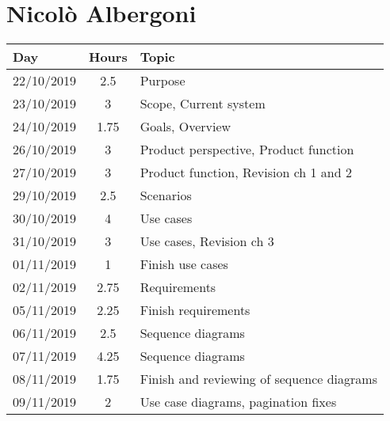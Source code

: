\section{Nicolò Albergoni}
\begin{table}[H]
  \centering
  \begin{tabularx}{\textwidth}{ |l|c|X| }
      \hline
      Day & Hours & Topic \\
      \hline
      22/10/2019 & 2.5 & Purpose \\								
      \hline
      23/10/2019 & 3 & Scope, Current system \\
      \hline
      24/10/2019 & 1.75	& Goals, Overview\\
      \hline								
      26/10/2019 & 3	& Product perspective, Product function\\									
      \hline
      27/10/2019 & 3 & Product function, Revision ch 1 and 2 \\									
      \hline
      29/10/2019 & 2.5 & Scenarios \\									
      \hline
      30/10/2019 & 4 & Use cases \\									
      \hline
      31/10/2019 & 3 & Use cases, Revision ch 3 \\
      \hline
      01/11/2019 & 1 & Finish use cases \\									
      \hline
      02/11/2019 & 2.75 & Requirements \\									
      \hline
      05/11/2019 & 2.25 & Finish requirements \\									
      \hline
      06/11/2019 & 2.5 & Sequence diagrams \\									
      \hline
      07/11/2019 & 4.25 & Sequence diagrams \\						
      \hline
      08/11/2019 & 1.75 & Finish and reviewing of sequence diagrams \\
      \hline
      09/11/2019 & 2 & Use case diagrams, pagination fixes	\\
      \hline      							
  \end{tabularx}
\end{table}
